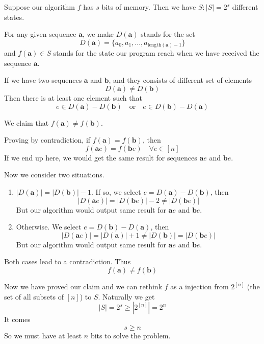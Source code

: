 Suppose our algorithm $f$ has $s$ bits of memory. Then we have $S:|S|=2^s$ different states.

For any given sequence $\mathbf{a}$, we make $D(\mathbf{a})$ stands for the set
\[
	D(\mathbf{a}) = \{a_0,a_1,\ldots,a_{\mathrm{length}(\mathbf{a})-1}\}
\]
and $f(\mathbf{a})\in S$ stands for the state our program reach when we have received the sequence $\mathbf{a}$.

If we have two sequences $\mathbf{a}$ and $\mathbf{b}$, and they consists of different set of elements
\[
	D(\mathbf{a})\neq D(\mathbf{b})
\]
Then there is at least one element such that
\[
	e\in D(\mathbf{a})-D(\mathbf{b})\quad\mathrm{or}\quad e\in D(\mathbf{b})-D(\mathbf{a})
\]

We claim that $f(\mathbf{a})\neq f(\mathbf{b})$.

Proving by contradiction, if $f(\mathbf{a})=f(\mathbf{b})$, then
\[
	f(\mathbf{a}e)=f(\mathbf{b}e)\quad\forall e\in[n]
\]
If we end up here, we would get the same result for sequences $\mathbf{a}e$ and $\mathbf{b}e$.

Now we consider two situations.

\begin{enumerate}[1.]
	\item $|D(\mathbf{a})|=|D(\mathbf{b})|-1$.
		If so, we select $e=D(\mathbf{a})-D(\mathbf{b})$, then
		\[
			|D(\mathbf{a}e)|=|D(\mathbf{b}e)|-2\neq|D(\mathbf{b}e)|
		\]
		But our algorithm would output same result for $\mathbf{a}e$ and $\mathbf{b}e$.
		
	\item Otherwise.
		We select $e=D(\mathbf{b})-D(\mathbf{a})$, then
		\[
			|D(\mathbf{a}e)|=|D(\mathbf{a})|+1\neq|D(\mathbf{b})|=|D(\mathbf{b}e)|
		\]
		But our algorithm would output same result for $\mathbf{a}e$ and $\mathbf{b}e$.
\end{enumerate}

Both cases lead to a contradiction. Thus
\[
	f(\mathbf{a})\neq f(\mathbf{b})
\]

Now we have proved our claim and we can rethink $f$ as a injection from $2^{[n]}$ (the set of all subsets of $[n]$) to $S$. Naturally we get
\[
	|S|=2^s\geq|2^{[n]}|=2^n
\]
It comes
\[
	s\geq n
\]
So we must have at least $n$ bits to solve the problem.
